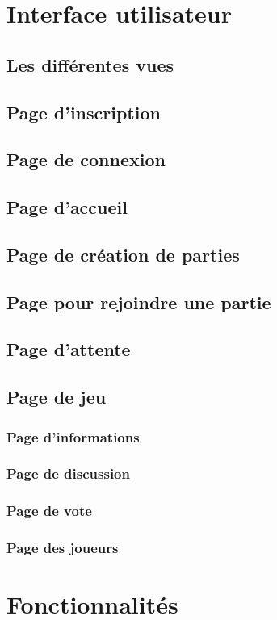 \documentclass[10pt]{article}
\begin{document}
\section{Interface utilisateur}

\subsection{Les différentes vues}
\subsection{Page d'inscription}
\subsection{Page de connexion}
\subsection{Page d'accueil}
\subsection{Page de création de parties}
\subsection{Page pour rejoindre une partie}
\subsection{Page d'attente}
\subsection{Page de jeu}
\subsubsection{Page d'informations}
\subsubsection{Page de discussion}
\subsubsection{Page de vote}
\subsubsection{Page des joueurs}

\section{Fonctionnalités}
\end{document}
